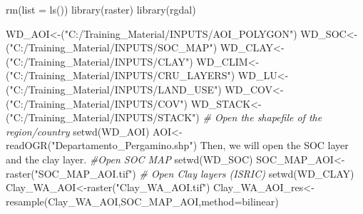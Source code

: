\documentclass[
  10pt,
  b5paper,
]{book}
\newenvironment{Shaded}{\begin{snugshade}}{\end{snugshade}}
\newcommand{\AttributeTok}[1]{\textcolor[rgb]{0.77,0.63,0.00}{#1}}
\newcommand{\CommentTok}[1]{\textcolor[rgb]{0.56,0.35,0.01}{\textit{#1}}}
\newcommand{\FunctionTok}[1]{\textcolor[rgb]{0.00,0.00,0.00}{#1}}
\newcommand{\NormalTok}[1]{#1}
\newcommand{\OtherTok}[1]{\textcolor[rgb]{0.56,0.35,0.01}{#1}}
\newcommand{\StringTok}[1]{\textcolor[rgb]{0.31,0.60,0.02}{#1}}
\begin{document}
\begin{Shaded}
\begin{Highlighting}[]
\FunctionTok{rm}\NormalTok{(}\AttributeTok{list =} \FunctionTok{ls}\NormalTok{())}
\FunctionTok{library}\NormalTok{(raster)}
\FunctionTok{library}\NormalTok{(rgdal)}

\NormalTok{WD\_AOI}\OtherTok{\textless{}{-}}\NormalTok{(}\StringTok{"C:/Training\_Material/INPUTS/AOI\_POLYGON"}\NormalTok{)}
\NormalTok{WD\_SOC}\OtherTok{\textless{}{-}}\NormalTok{(}\StringTok{"C:/Training\_Material/INPUTS/SOC\_MAP"}\NormalTok{)}
\NormalTok{WD\_CLAY}\OtherTok{\textless{}{-}}\NormalTok{(}\StringTok{"C:/Training\_Material/INPUTS/CLAY"}\NormalTok{)}
\NormalTok{WD\_CLIM}\OtherTok{\textless{}{-}}\NormalTok{(}\StringTok{"C:/Training\_Material/INPUTS/CRU\_LAYERS"}\NormalTok{)}
\NormalTok{WD\_LU}\OtherTok{\textless{}{-}}\NormalTok{(}\StringTok{"C:/Training\_Material/INPUTS/LAND\_USE"}\NormalTok{)}
\NormalTok{WD\_COV}\OtherTok{\textless{}{-}}\NormalTok{(}\StringTok{"C:/Training\_Material/INPUTS/COV"}\NormalTok{)}
\NormalTok{WD\_STACK}\OtherTok{\textless{}{-}}\NormalTok{(}\StringTok{"C:/Training\_Material/INPUTS/STACK"}\NormalTok{)}
\CommentTok{\# Open the shapefile of the region/country}
\FunctionTok{setwd}\NormalTok{(WD\_AOI)}
\NormalTok{AOI}\OtherTok{\textless{}{-}}\FunctionTok{readOGR}\NormalTok{(}\StringTok{"Departamento\_Pergamino.shp"}\NormalTok{)}
\NormalTok{Then, we will open the SOC layer and the clay layer.}
\CommentTok{\#Open SOC MAP }
\FunctionTok{setwd}\NormalTok{(WD\_SOC)}
\NormalTok{SOC\_MAP\_AOI}\OtherTok{\textless{}{-}}\FunctionTok{raster}\NormalTok{(}\StringTok{"SOC\_MAP\_AOI.tif"}\NormalTok{)}
\CommentTok{\# Open Clay layers  (ISRIC)}
\FunctionTok{setwd}\NormalTok{(WD\_CLAY)}
\NormalTok{Clay\_WA\_AOI}\OtherTok{\textless{}{-}}\FunctionTok{raster}\NormalTok{(}\StringTok{"Clay\_WA\_AOI.tif"}\NormalTok{)}
\NormalTok{Clay\_WA\_AOI\_res}\OtherTok{\textless{}{-}}\FunctionTok{resample}\NormalTok{(Clay\_WA\_AOI,SOC\_MAP\_AOI,}\AttributeTok{method=}\StringTok{\textquotesingle{}bilinear\textquotesingle{}}\NormalTok{) }


\end{Highlighting}
\end{Shaded}
\end{document}
